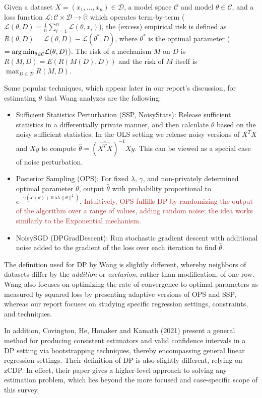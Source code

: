 \documentclass[11pt,conference]{IEEEtran}
\begin{document}
\begin{definition}
Given a dataset $X=(x_1,\dots,x_n)\in \mathcal{D}$, a model space $\mathcal{C}$ and model $\theta\in \mathcal{C}$, and a loss function $\mathcal{L}:\mathcal{C}\times \mathcal{D}\to \mathbb{R}$ which operates term-by-term ($\mathcal{L}(\theta, D)=\frac{1}{n}\sum_{i=1}^n \mathcal{L}(\theta, x_i)$), the (excess) empirical risk is defined as $R(\theta, D)=\mathcal{L}(\theta, D)-\mathcal{L}(\theta^*,D)$, where $\theta^*$ is the optimal parameter ($=\text{arg\,min}_{\theta\in \mathcal{C}} \mathcal{L}(\theta,D)$). The risk of a mechanism $M$ on $D$ is $R(M, D)=E(R(M(D), D))$ and the risk of $M$ itself is $\max_{D\in \mathcal{D}} R(M, D)$. 

Some popular techniques, which appear later in our report's discussion, for estimating $\theta$ that Wang analyzes are the following:
\begin{itemize}
    \item Sufficient Statistics Perturbation (SSP, NoisyStats): Release sufficient statistics in a differentially private manner, and then calculate $\theta$ based on the noisy sufficient statistics. In the OLS setting we release noisy versions of $X^T X$ and $Xy$ to compute $\hat{\theta}=(\widehat{X^T X})^{-1}\widehat{Xy}$. This can be viewed as a special case of noise perturbation.
    \item Posterior Sampling (OPS): For fixed $\lambda$, $\gamma$, and non-privately determined optimal parameter $\theta$, output $\hat{\theta}$ with probability proportional to $e^{-\gamma(\mathcal{L}(\theta)+0.5\lambda \|\theta\|^2)}$. \textcolor{brown}{Intuitively, OPS fulfills DP by randomizing the output of the algorithm over a range of values, adding random noise; the idea works similarly to the Exponential mechanism.}
    \item NoisySGD (DPGradDescent): Run stochastic gradient descent with additional noise added to the gradient of the loss over each iteration to find $\hat{\theta}$.
\end{itemize}

The definition used for DP by Wang is slightly different, whereby neighbors of datasets differ by the \textit{addition} or \textit{exclusion}, rather than modification, of one row. Wang also focuses on optimizing the rate of convergence to optimal parameters as measured by squared loss by presenting adaptive versions of OPS and SSP, whereas our report focuses on studying specific regression settings, constraints, and techniques.

In addition, Covington, He, Honaker and Kamath (2021) present a general method for producing consistent estimators and valid confidence intervals in a DP setting via bootstrapping techniques, thereby encompassing general linear regression settings. Their definition of DP is also slightly different, relying on zCDP. In effect, their paper gives a higher-level approach to solving any estimation problem, which lies beyond the more focused and case-specific scope of this survey.

\end{definition}
\end{document}

